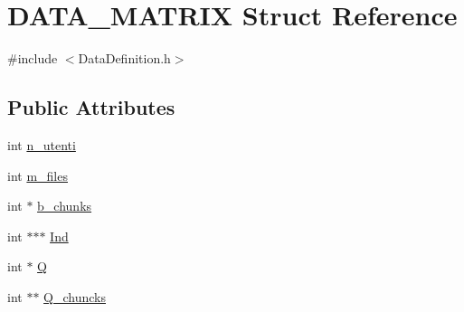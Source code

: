 \hypertarget{structDATA__MATRIX}{\section{D\-A\-T\-A\-\_\-\-M\-A\-T\-R\-I\-X Struct Reference}
\label{structDATA__MATRIX}
}


{\ttfamily \#include $<$Data\-Definition.\-h$>$}

\subsection*{Public Attributes}
\begin{DoxyCompactItemize}
\item 
int \hyperlink{structDATA__MATRIX_aae6daea8805e8718aa68a84bcca6241b}{n\-\_\-utenti}
\item 
int \hyperlink{structDATA__MATRIX_a4dabab55b019bad68745b2017beca72f}{m\-\_\-files}
\item 
int $\ast$ \hyperlink{structDATA__MATRIX_aa574a94bfa3d76f0677cc7d223548ec8}{b\-\_\-chunks}
\item 
int $\ast$$\ast$$\ast$ \hyperlink{structDATA__MATRIX_ab84fa0383965f21e5169de993040734a}{Ind}
\item 
int $\ast$ \hyperlink{structDATA__MATRIX_a6cc2252dd6e2e65dd098c0ded22a75a9}{Q}
\item 
int $\ast$$\ast$ \hyperlink{structDATA__MATRIX_afddbea5ee6d0ab5d894b4ac1dc79681c}{Q\-\_\-chuncks}
\end{DoxyCompactItemize}


